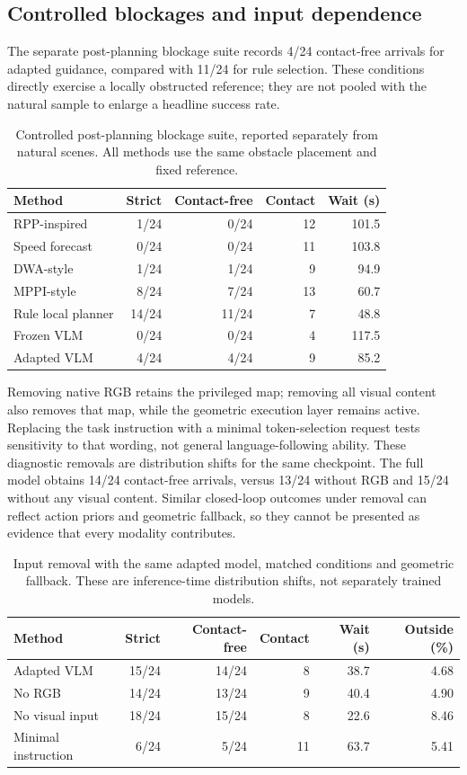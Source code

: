 \documentclass[10pt,a4paper]{article}
\begin{document}
\subsection{Controlled blockages and input dependence}
The separate post-planning blockage suite records 4/24 contact-free arrivals for adapted guidance, compared with 11/24 for rule selection. These conditions directly exercise a locally obstructed reference; they are not pooled with the natural sample to enlarge a headline success rate.
\begin{table}[tb]\centering\small\caption{Controlled post-planning blockage suite, reported separately from natural scenes. All methods use the same obstacle placement and fixed reference.}\begin{tabular}{lrrrr}\toprule
Method & Strict & Contact-free & Contact & Wait (s) \\ \midrule
RPP-inspired & 1/24 & 0/24 & 12 & 101.5 \\
Speed forecast & 0/24 & 0/24 & 11 & 103.8 \\
DWA-style & 1/24 & 1/24 & 9 & 94.9 \\
MPPI-style & 8/24 & 7/24 & 13 & 60.7 \\
Rule local planner & 14/24 & 11/24 & 7 & 48.8 \\
Frozen VLM & 0/24 & 0/24 & 4 & 117.5 \\
Adapted VLM & 4/24 & 4/24 & 9 & 85.2 \\
\bottomrule\end{tabular}\end{table}
Removing native RGB retains the privileged map; removing all visual content also removes that map, while the geometric execution layer remains active. Replacing the task instruction with a minimal token-selection request tests sensitivity to that wording, not general language-following ability. These diagnostic removals are distribution shifts for the same checkpoint. The full model obtains 14/24 contact-free arrivals, versus 13/24 without RGB and 15/24 without any visual content. Similar closed-loop outcomes under removal can reflect action priors and geometric fallback, so they cannot be presented as evidence that every modality contributes.
\begin{table}[tb]\centering\small\caption{Input removal with the same adapted model, matched conditions and geometric fallback. These are inference-time distribution shifts, not separately trained models.}\begin{tabular}{lrrrrr}\toprule
Method & Strict & Contact-free & Contact & Wait (s) & Outside (\%) \\ \midrule
Adapted VLM & 15/24 & 14/24 & 8 & 38.7 & 4.68 \\
No RGB & 14/24 & 13/24 & 9 & 40.4 & 4.90 \\
No visual input & 18/24 & 15/24 & 8 & 22.6 & 8.46 \\
Minimal instruction & 6/24 & 5/24 & 11 & 63.7 & 5.41 \\
\bottomrule\end{tabular}\end{table}
\end{document}
